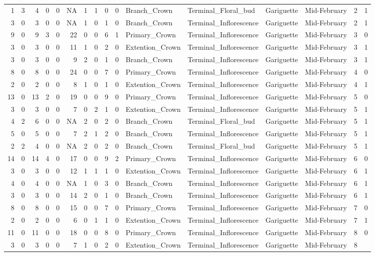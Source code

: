\documentclass[]{article}
\begin{document}
\begin{longtable}[]{@{}rrrrrrrrrrllllrl@{}}
1 & 3 & 4 & 0 & 0 & NA & 1 & 1 & 0 & 0 & Branch\_Crown &
Terminal\_Floral\_bud & Gariguette & Mid-February & 2 & 1\tabularnewline
3 & 0 & 3 & 0 & 0 & NA & 1 & 0 & 1 & 0 & Branch\_Crown &
Terminal\_Inflorescence & Gariguette & Mid-February & 2 &
1\tabularnewline
9 & 0 & 9 & 3 & 0 & 22 & 0 & 0 & 6 & 1 & Primary\_Crown &
Terminal\_Inflorescence & Gariguette & Mid-February & 3 &
0\tabularnewline
3 & 0 & 3 & 0 & 0 & 11 & 1 & 0 & 2 & 0 & Extention\_Crown &
Terminal\_Inflorescence & Gariguette & Mid-February & 3 &
1\tabularnewline
3 & 0 & 3 & 0 & 0 & 9 & 2 & 0 & 1 & 0 & Branch\_Crown &
Terminal\_Inflorescence & Gariguette & Mid-February & 3 &
1\tabularnewline
8 & 0 & 8 & 0 & 0 & 24 & 0 & 0 & 7 & 0 & Primary\_Crown &
Terminal\_Inflorescence & Gariguette & Mid-February & 4 &
0\tabularnewline
2 & 0 & 2 & 0 & 0 & 8 & 1 & 0 & 1 & 0 & Extention\_Crown &
Terminal\_Inflorescence & Gariguette & Mid-February & 4 &
1\tabularnewline
13 & 0 & 13 & 2 & 0 & 19 & 0 & 0 & 9 & 0 & Primary\_Crown &
Terminal\_Inflorescence & Gariguette & Mid-February & 5 &
0\tabularnewline
3 & 0 & 3 & 0 & 0 & 7 & 0 & 2 & 1 & 0 & Extention\_Crown &
Terminal\_Inflorescence & Gariguette & Mid-February & 5 &
1\tabularnewline
4 & 2 & 6 & 0 & 0 & NA & 2 & 0 & 2 & 0 & Branch\_Crown &
Terminal\_Floral\_bud & Gariguette & Mid-February & 5 & 1\tabularnewline
5 & 0 & 5 & 0 & 0 & 7 & 2 & 1 & 2 & 0 & Branch\_Crown &
Terminal\_Inflorescence & Gariguette & Mid-February & 5 &
1\tabularnewline
2 & 2 & 4 & 0 & 0 & NA & 2 & 0 & 2 & 0 & Branch\_Crown &
Terminal\_Floral\_bud & Gariguette & Mid-February & 5 & 1\tabularnewline
14 & 0 & 14 & 4 & 0 & 17 & 0 & 0 & 9 & 2 & Primary\_Crown &
Terminal\_Inflorescence & Gariguette & Mid-February & 6 &
0\tabularnewline
3 & 0 & 3 & 0 & 0 & 12 & 1 & 1 & 1 & 0 & Extention\_Crown &
Terminal\_Inflorescence & Gariguette & Mid-February & 6 &
1\tabularnewline
4 & 0 & 4 & 0 & 0 & NA & 1 & 0 & 3 & 0 & Branch\_Crown &
Terminal\_Inflorescence & Gariguette & Mid-February & 6 &
1\tabularnewline
3 & 0 & 3 & 0 & 0 & 14 & 2 & 0 & 1 & 0 & Branch\_Crown &
Terminal\_Inflorescence & Gariguette & Mid-February & 6 &
1\tabularnewline
8 & 0 & 8 & 0 & 0 & 15 & 0 & 0 & 7 & 0 & Primary\_Crown &
Terminal\_Inflorescence & Gariguette & Mid-February & 7 &
0\tabularnewline
2 & 0 & 2 & 0 & 0 & 6 & 0 & 1 & 1 & 0 & Extention\_Crown &
Terminal\_Inflorescence & Gariguette & Mid-February & 7 &
1\tabularnewline
11 & 0 & 11 & 0 & 0 & 18 & 0 & 0 & 8 & 0 & Primary\_Crown &
Terminal\_Inflorescence & Gariguette & Mid-February & 8 &
0\tabularnewline
3 & 0 & 3 & 0 & 0 & 7 & 1 & 0 & 2 & 0 & Extention\_Crown &
Terminal\_Inflorescence & Gariguette & Mid-February & 8 &

\end{longtable}
\end{document}
